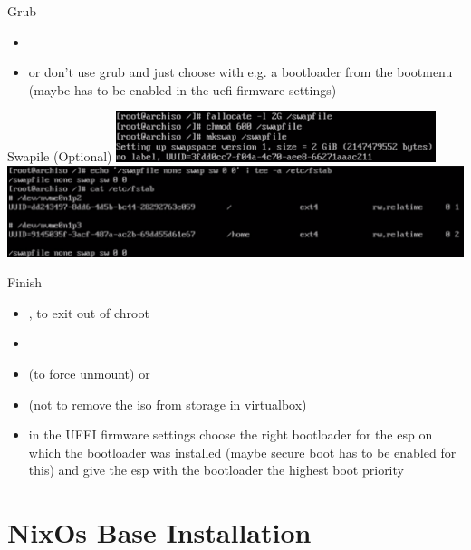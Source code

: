 \begin{frame}{Grub}
\begin{itemize}
\begin{itemize}
      \end{itemize}
    \item {}
  \end{itemize}
  \begin{Sidenote}
    \begin{itemize}
      \scriptsize
      \item or don't use grub and just choose with e.g.  a bootloader from the bootmenu (maybe has to be enabled in the uefi-firmware settings)
    \end{itemize}
  \end{Sidenote}
\end{frame}

\begin{frame}{Swapile (Optional)}
  \includegraphics[width=0.7\textwidth]{./figures/swapfile.png}
  \includegraphics[width=\textwidth]{./figures/swapfile2.png}
\end{frame}

\begin{frame}[fragile]{Finish}
  \begin{itemize}
    \item {}, to exit out of chroot
    \item {}
      \item {} (to force unmount) or 
    \item {} (not  to remove the iso from storage in virtualbox)
    \item in the UFEI firmware settings   choose the right bootloader for the esp on which the bootloader was installed (maybe secure boot has to be enabled for this) and give the esp with the bootloader the highest boot priority
  \end{itemize}
\end{frame}

\section{NixOs Base Installation}

